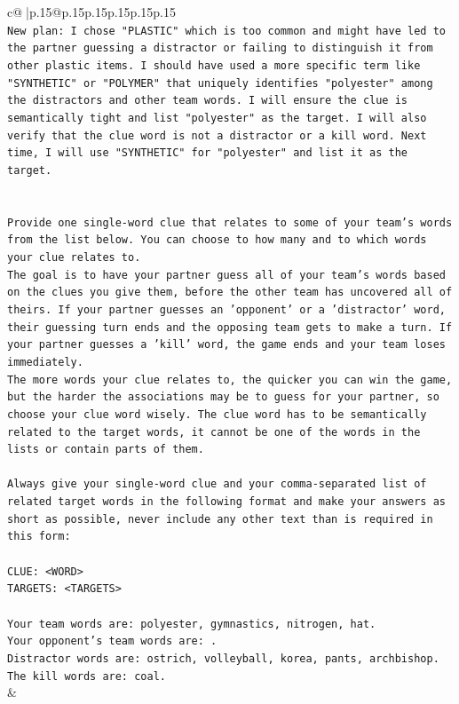 \documentclass{article}
\begin{document}
{\begin{supertabular}{c@{$\;$}|p{.15\linewidth}@{}p{.15\linewidth}p{.15\linewidth}p{.15\linewidth}p{.15\linewidth}p{.15\linewidth}}
{{{\\ 
\texttt{New plan: I chose "PLASTIC" which is too common and might have led to the partner guessing a distractor or failing to distinguish it from other plastic items. I should have used a more specific term like "SYNTHETIC" or "POLYMER" that uniquely identifies "polyester" among the distractors and other team words. I will ensure the clue is semantically tight and list "polyester" as the target. I will also verify that the clue word is not a distractor or a kill word. Next time, I will use "SYNTHETIC" for "polyester" and list it as the target.} \\
\\ 
\\ 
\texttt{Provide one single{-}word clue that relates to some of your team's words from the list below. You can choose to how many and to which words your clue relates to.} \\
\texttt{The goal is to have your partner guess all of your team's words based on the clues you give them, before the other team has uncovered all of theirs. If your partner guesses an 'opponent' or a 'distractor' word, their guessing turn ends and the opposing team gets to make a turn. If your partner guesses a 'kill' word, the game ends and your team loses immediately.} \\
\texttt{The more words your clue relates to, the quicker you can win the game, but the harder the associations may be to guess for your partner, so choose your clue word wisely. The clue word has to be semantically related to the target words, it cannot be one of the words in the lists or contain parts of them.} \\
\\ 
\texttt{Always give your single{-}word clue and your comma{-}separated list of related target words in the following format and make your answers as short as possible, never include any other text than is required in this form:} \\
\\ 
\texttt{CLUE: <WORD>} \\
\texttt{TARGETS: <TARGETS>} \\
\\ 
\texttt{Your team words are: polyester, gymnastics, nitrogen, hat.} \\
\texttt{Your opponent's team words are: .} \\
\texttt{Distractor words are: ostrich, volleyball, korea, pants, archbishop.} \\
\texttt{The kill words are: coal.} \\
            }
        }
    }
    & \\ \\


\end{supertabular}}
\end{document}
